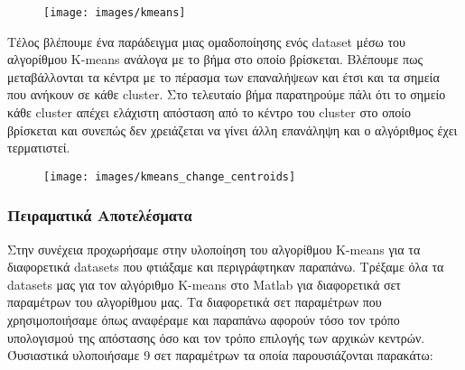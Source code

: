 \begin{figure}
    \centering
    \texttt{[image: images/kmeans]}
    \caption{}
    \label{fig:kmeans}
\end{figure}

Τέλος βλέπουμε ένα παράδειγμα μιας ομαδοποίησης ενός dataset μέσω του αλγορίθμου K-means ανάλογα με το βήμα στο οποίο βρίσκεται. Βλέπουμε πως μεταβάλλονται τα κέντρα με το πέρασμα των επαναλήψεων και έτσι και τα σημεία που ανήκουν σε κάθε cluster. Στο τελευταίο βήμα παρατηρούμε πάλι ότι το σημείο κάθε cluster απέχει ελάχιστη απόσταση από το κέντρο του cluster στο οποίο βρίσκεται και συνεπώς δεν χρειάζεται να γίνει άλλη επανάληψη και ο αλγόριθμος έχει τερματιστεί.

\begin{figure}
\centering
\texttt{[image: images/kmeans\_change\_centroids]}
\caption{}
\label{fig:kmeans_change_centroids}
\end{figure}

\subsubsection{Πειραματικά Αποτελέσματα}

Στην συνέχεια προχωρήσαμε στην υλοποίηση του αλγορίθμου K-means για τα διαφορετικά datasets που φτιάξαμε και περιγράφτηκαν παραπάνω. Τρέξαμε όλα τα datasets μας για τον αλγόριθμο K-means στο Matlab για διαφορετικά σετ παραμέτρων του αλγορίθμου μας. Τα διαφορετικά σετ παραμέτρων που χρησιμοποιήσαμε όπως αναφέραμε και παραπάνω αφορούν τόσο τον τρόπο υπολογισμού της απόστασης όσο και τον τρόπο επιλογής των αρχικών κεντρών. Όυσιαστικά υλοποιήσαμε 9 σετ παραμέτρων τα οποία παρουσιάζονται παρακάτω: 

